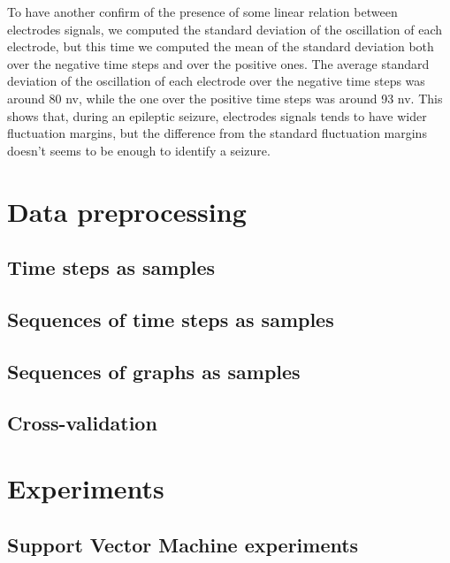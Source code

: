 To have another confirm of the presence of some linear relation between electrodes signals, we computed the standard deviation of the oscillation of each electrode, but this time we computed the mean of the standard deviation both over the negative time steps and over the positive ones. The average standard deviation of the oscillation of each electrode over the negative time steps was around 80 \acs{nv}, while the one over the positive time steps was around 93 \acs{nv}. This shows that, during an epileptic seizure, electrodes signals tends to have wider fluctuation margins, but the difference from the standard fluctuation margins doesn't seems to be enough to identify a seizure.








\section{Data preprocessing} \label{sec: data_preprocessing}

\subsection{Time steps as samples}
\subsection{Sequences of time steps as samples}
\subsection{Sequences of graphs as samples}
\subsection{Cross-validation}


\section{Experiments} \label{sec: experiments}

\subsection{Support Vector Machine experiments}
